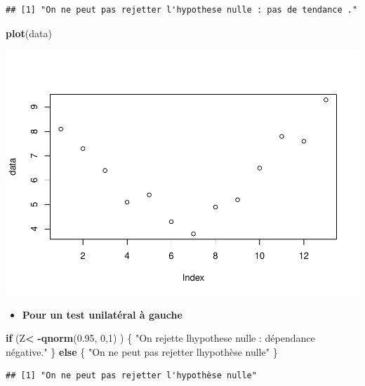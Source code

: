 \documentclass[
  12pt,
]{article}
\newenvironment{Shaded}{\begin{snugshade}}{\end{snugshade}}
\newcommand{\ControlFlowTok}[1]{\textcolor[rgb]{0.13,0.29,0.53}{\textbf{#1}}}
\newcommand{\DecValTok}[1]{\textcolor[rgb]{0.00,0.00,0.81}{#1}}
\newcommand{\FloatTok}[1]{\textcolor[rgb]{0.00,0.00,0.81}{#1}}
\newcommand{\FunctionTok}[1]{\textcolor[rgb]{0.13,0.29,0.53}{\textbf{#1}}}
\newcommand{\NormalTok}[1]{#1}
\newcommand{\SpecialCharTok}[1]{\textcolor[rgb]{0.81,0.36,0.00}{\textbf{#1}}}
\newcommand{\StringTok}[1]{\textcolor[rgb]{0.31,0.60,0.02}{#1}}
\providecommand{\tightlist}{%
  \setlength{\itemsep}{0pt}\setlength{\parskip}{0pt}}
\begin{document}
\begin{verbatim}
## [1] "On ne peut pas rejetter l'hypothese nulle : pas de tendance ."
\end{verbatim}

\begin{Shaded}
\begin{Highlighting}[]
\FunctionTok{plot}\NormalTok{(data)}
\end{Highlighting}
\end{Shaded}

\includegraphics{Stat_non_para_files/figure-latex/unnamed-chunk-37-1.pdf}

\begin{itemize}
\tightlist
\item
  \textbf{Pour un test unilatéral à gauche}
\end{itemize}

\begin{Shaded}
\begin{Highlighting}[]
\ControlFlowTok{if}\NormalTok{ (Z}\SpecialCharTok{\textless{}} \SpecialCharTok{{-}}\FunctionTok{qnorm}\NormalTok{(}\FloatTok{0.95}\NormalTok{, }\DecValTok{0}\NormalTok{,}\DecValTok{1}\NormalTok{) ) \{}
\StringTok{"On rejette l\textquotesingle{}hypothese nulle : dépendance négative."}
\NormalTok{\} }\ControlFlowTok{else}\NormalTok{ \{}
\StringTok{"On ne peut pas rejetter l\textquotesingle{}hypothèse nulle"}
\NormalTok{\}}
\end{Highlighting}
\end{Shaded}

\begin{verbatim}
## [1] "On ne peut pas rejetter l'hypothèse nulle"
\end{verbatim}
\end{document}
